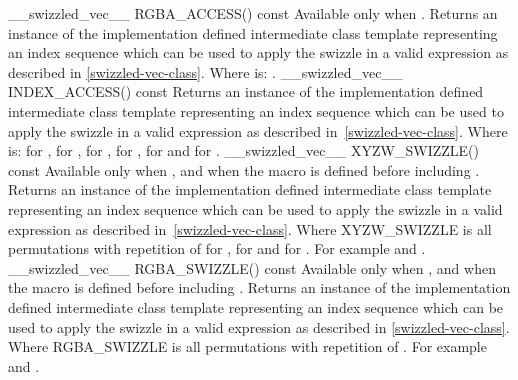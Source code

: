   \addRow
    {\__swizzled_vec__ RGBA_ACCESS() const}
    {
      Available only when .
      \newline \newline
      Returns an instance of the implementation defined intermediate class template  representing an index sequence which can be used to apply the swizzle in a valid expression as described in \ref{swizzled-vec-class}.
      \newline \newline
      Where  is: .
    }
  \addRow
    {\__swizzled_vec__ INDEX_ACCESS() const}
    {
      Returns an instance of the implementation defined intermediate class template  representing an index sequence which can be used to apply the swizzle in a valid expression as described in~\ref{swizzled-vec-class}.
      \newline \newline
      Where  is:  for ,  for ,  for ,  for ,  for  and  for .
    }
  \addRow
    {\__swizzled_vec__ XYZW_SWIZZLE() const}
    {
      Available only when , and when the macro  is defined before including .
      \newline \newline
      Returns an instance of the implementation defined intermediate class template  representing an index sequence which can be used to apply the swizzle in a valid expression as described in~\ref{swizzled-vec-class}.
    \newline \newline
    Where XYZW\_SWIZZLE is all permutations with repetition of  for ,  for  and  for . For example  and .
    }
  \addRow
    {\__swizzled_vec__ RGBA_SWIZZLE() const}
    {
      Available only when , and when the macro  is defined before including .
      \newline \newline
      Returns an instance of the implementation defined intermediate class template  representing an index sequence which can be used to apply the swizzle in a valid expression as described in \ref{swizzled-vec-class}.
    \newline \newline
    Where RGBA\_SWIZZLE is all permutations with repetition of . For example  and .
    }
